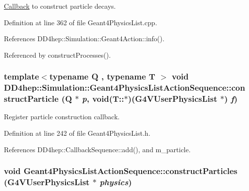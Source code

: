 \hyperlink{class_d_d4hep_1_1_callback}{Callback} to construct particle decays. 

Definition at line 362 of file Geant4PhysicsList.cpp.

References DD4hep::Simulation::Geant4Action::info().

Referenced by constructProcesses().\hypertarget{class_d_d4hep_1_1_simulation_1_1_geant4_physics_list_action_sequence_a31c1318893387db2f3441afbb7d6dd29}{
\subsubsection[{constructParticle}]{\setlength{\rightskip}{0pt plus 5cm}template$<$typename Q , typename T $>$ void DD4hep::Simulation::Geant4PhysicsListActionSequence::constructParticle (Q $\ast$ {\em p}, \/  void(T::$\ast$)(G4VUserPhysicsList $\ast$) {\em f})}}
\label{class_d_d4hep_1_1_simulation_1_1_geant4_physics_list_action_sequence_a31c1318893387db2f3441afbb7d6dd29}


Register particle construction callback. 

Definition at line 242 of file Geant4PhysicsList.h.

References DD4hep::CallbackSequence::add(), and m\_\-particle.\hypertarget{class_d_d4hep_1_1_simulation_1_1_geant4_physics_list_action_sequence_a4061788d8d84ae4bad79f7f8e53ec14b}{
\subsubsection[{constructParticles}]{\setlength{\rightskip}{0pt plus 5cm}void Geant4PhysicsListActionSequence::constructParticles (G4VUserPhysicsList $\ast$ {\em physics})}}
\label{class_d_d4hep_1_1_simulation_1_1_geant4_physics_list_action_sequence_a4061788d8d84ae4bad79f7f8e53ec14b}


